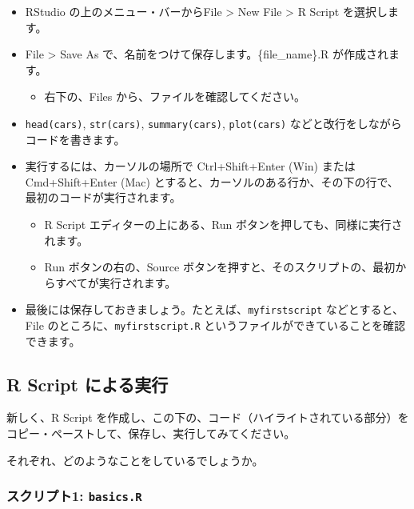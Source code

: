 \documentclass[
  xelatex, ja=standard]{bxjsbook}
\providecommand{\tightlist}{%
  \setlength{\itemsep}{0pt}\setlength{\parskip}{0pt}}
\theoremstyle{definition}
\theoremstyle{definition}
\theoremstyle{definition}
\theoremstyle{definition}
\theoremstyle{remark}
\begin{document}
\begin{itemize}
\tightlist
\item
  RStudio の上のメニュー・バーからFile \textgreater{} New File \textgreater{} R Script を選択します。
\item
  File \textgreater{} Save As で、名前をつけて保存します。\{file\_name\}.R が作成されます。

  \begin{itemize}
  \tightlist
  \item
    右下の、Files から、ファイルを確認してください。
  \end{itemize}
\item
  \texttt{head(cars)}, \texttt{str(cars)}, \texttt{summary(cars)}, \texttt{plot(cars)} などと改行をしながらコードを書きます。
\item
  実行するには、カーソルの場所で Ctrl+Shift+Enter (Win) または Cmd+Shift+Enter (Mac) とすると、カーソルのある行か、その下の行で、最初のコードが実行されます。

  \begin{itemize}
  \tightlist
  \item
    R Script エディターの上にある、Run ボタンを押しても、同様に実行されます。
  \item
    Run ボタンの右の、Source ボタンを押すと、そのスクリプトの、最初からすべてが実行されます。
  \end{itemize}
\item
  最後には保存しておきましょう。たとえば、\texttt{myfirstscript} などとすると、File のところに、\texttt{myfirstscript.R} というファイルができていることを確認できます。
\end{itemize}

\hypertarget{r-script-ux306bux3088ux308bux5b9fux884c}{%
\subsection{R Script による実行}\label{r-script-ux306bux3088ux308bux5b9fux884c}}

新しく、R Script を作成し、この下の、コード（ハイライトされている部分）をコピー・ペーストして、保存し、実行してみてください。

それぞれ、どのようなことをしているでしょうか。

\hypertarget{ux30b9ux30afux30eaux30d7ux30c81-basics.r}{%
\subsubsection{\texorpdfstring{スクリプト1: \texttt{basics.R}}{スクリプト1: basics.R}}\label{ux30b9ux30afux30eaux30d7ux30c81-basics.r}}
\end{document}
